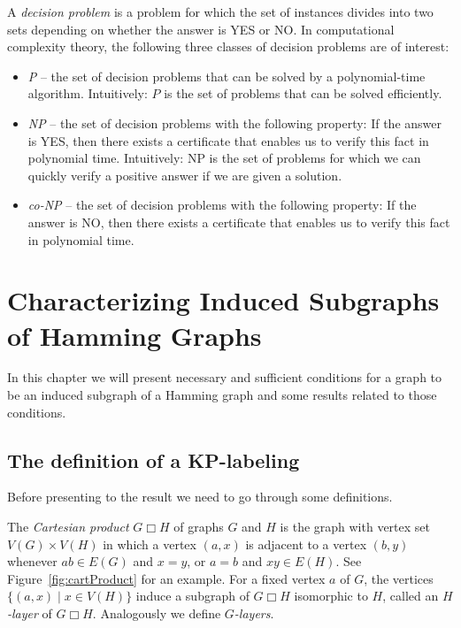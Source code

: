 \documentclass[12pt,a4paper,titlepage,openany]{report}
\begin{document}
A \textit{decision problem} is a problem for which the set of instances divides into two sets depending on whether the answer is YES or NO.
In computational complexity theory, the following three classes of decision problems are of interest:
\begin{itemize}
\item {\it P} -- the set of decision problems that can be solved by a polynomial-time algorithm. Intuitively: $P$ is the set of problems that can be solved efficiently.
\item {\it NP} -- the set of decision problems with the following property:
If the answer is YES, then there exists a certificate that
enables us to verify this fact in polynomial time. Intuitively: NP is the set of problems for which we can
quickly verify a positive answer if we are given a solution.
\item {\it co-NP} -- the set of decision problems with the following property:
If the answer is NO, then there exists a certificate that
enables us to verify this fact in polynomial time.
\end{itemize}

\chapter{Characterizing Induced Subgraphs of Hamming Graphs}\label{kp-chapter}
\thispagestyle{fancy}

In this chapter we will present necessary and sufficient conditions for a graph to be an induced subgraph of a Hamming graph and some results related to those conditions.

\section{The definition of a KP-labeling}\label{kp-labeling-section}

Before presenting to the result we need to go through some definitions.

The \emph{Cartesian product} $G \Box H$ of graphs $G$ and $H$ is the graph with vertex set $V(G)\times V(H)$ in which a vertex $(a,x)$ is adjacent to a vertex $(b,y)$ whenever $ab\in E(G)$ and $x=y$, or $a=b$ and $xy\in E(H)$. See Figure~\ref{fig:cartProduct} for an example. For a fixed vertex $a$ of $G$, the vertices $\{(a,x)\mid x\in V(H)\}$ induce a subgraph of $G \Box H$ isomorphic to $H$, called an \textit{$H$-layer} of $G \Box H$. Analogously we define \textit{$G$-layers}.
\end{document}
